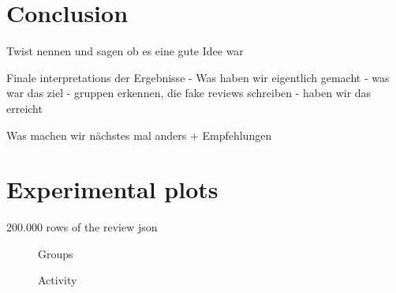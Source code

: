 \documentclass[conference]{IEEEtran}  %
\theoremstyle{plain}
\theoremstyle{definition}
\theoremstyle{remark}
\begin{document}
\section{Conclusion}
\label{sec:concl}


Twist nennen und sagen ob es eine gute Idee war

Finale interpretations der Ergebnisse 
 - Was haben wir eigentlich gemacht
 - was war das ziel
     - gruppen erkennen, die fake reviews schreiben
 - haben wir das erreicht


Was machen wir nächstes mal anders + Empfehlungen


\section{Experimental plots}
\label{sec:plots}

200.000 rows of the review json

\graphicspath{{plots/}}


\begin{figure}[H]
  \centering
  \hfill
  \caption{Groups}
\end{figure}


\begin{figure}[H]
  \centering
  \hfill
  \caption{Activity}
\end{figure}
\end{document}

